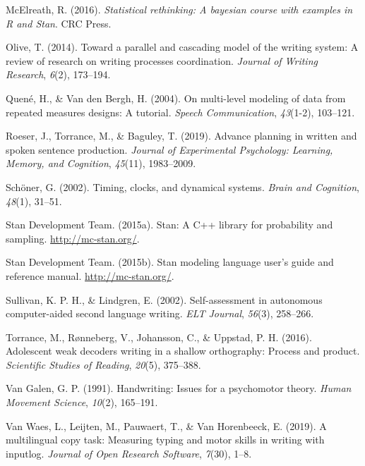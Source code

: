 \documentclass[english,man,floatsintext]{apa7}
\begin{document}
\leavevmode\hypertarget{ref-mcelreath2016statistical}{}%
McElreath, R. (2016). \emph{Statistical rethinking: A bayesian course with examples in R and Stan}. CRC Press.

\leavevmode\hypertarget{ref-olive2014toward}{}%
Olive, T. (2014). Toward a parallel and cascading model of the writing system: A review of research on writing processes coordination. \emph{Journal of Writing Research}, \emph{6}(2), 173--194.

\leavevmode\hypertarget{ref-quene2004multi}{}%
Quené, H., \& Van den Bergh, H. (2004). On multi-level modeling of data from repeated measures designs: A tutorial. \emph{Speech Communication}, \emph{43}(1-2), 103--121.

\leavevmode\hypertarget{ref-roeser2019advance}{}%
Roeser, J., Torrance, M., \& Baguley, T. (2019). Advance planning in written and spoken sentence production. \emph{Journal of Experimental Psychology: Learning, Memory, and Cognition}, \emph{45}(11), 1983--2009.

\leavevmode\hypertarget{ref-schoner2002timing}{}%
Schöner, G. (2002). Timing, clocks, and dynamical systems. \emph{Brain and Cognition}, \emph{48}(1), 31--51.

\leavevmode\hypertarget{ref-rstan}{}%
Stan Development Team. (2015a). Stan: A C++ library for probability and sampling. \url{http://mc-stan.org/}.

\leavevmode\hypertarget{ref-rstan2}{}%
Stan Development Team. (2015b). Stan modeling language user's guide and reference manual. \url{http://mc-stan.org/}.

\leavevmode\hypertarget{ref-sullivan2002self}{}%
Sullivan, K. P. H., \& Lindgren, E. (2002). Self-assessment in autonomous computer-aided second language writing. \emph{ELT Journal}, \emph{56}(3), 258--266.

\leavevmode\hypertarget{ref-torrance2016adolescent}{}%
Torrance, M., Rønneberg, V., Johansson, C., \& Uppstad, P. H. (2016). Adolescent weak decoders writing in a shallow orthography: Process and product. \emph{Scientific Studies of Reading}, \emph{20}(5), 375--388.

\leavevmode\hypertarget{ref-van1991handwriting}{}%
Van Galen, G. P. (1991). Handwriting: Issues for a psychomotor theory. \emph{Human Movement Science}, \emph{10}(2), 165--191.

\leavevmode\hypertarget{ref-van2019multilingual}{}%
Van Waes, L., Leijten, M., Pauwaert, T., \& Van Horenbeeck, E. (2019). A multilingual copy task: Measuring typing and motor skills in writing with inputlog. \emph{Journal of Open Research Software}, \emph{7}(30), 1--8.
\end{document}
